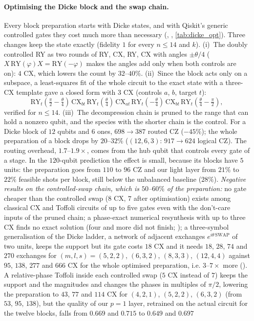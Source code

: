 \paragraph{Optimising the Dicke block and the swap chain.}  Every block preparation starts with Dicke states, and with Qiskit's generic controlled gates they cost much more than necessary (, , \cref{tab:dicke_opt}). Three changes keep the state exactly (fidelity $1$ for every $n\le14$ and $k$). (i)~The doubly controlled RY as two rounds of RY, CX, RY, CX with angles $\pm\theta/4$ ($X\,\mathrm{RY}(\varphi)X=\mathrm{RY}(-\varphi)$ makes the angles add only when both controls are on): $4$ CX, which lowers the count by $32$--$40\%$. (ii)~Since the block acts only on a subspace, a least-squares fit of the whole circuit to the exact state with a three-CX template gave a closed form with $3$ CX (controls $a$, $b$, target $t$): \begin{equation*}\mathrm{RY}_t(\tfrac{\pi}{2}-\tfrac{\theta}{4})\,\mathrm{CX}_{bt}\,\mathrm{RY}_t(\tfrac{\theta}{4})\,\mathrm{CX}_{at}\,\mathrm{RY}_t(-\tfrac{\theta}{4})\,\mathrm{CX}_{bt}\,\mathrm{RY}_t(\tfrac{\theta}{4}-\tfrac{\pi}{2}),\end{equation*}verified for $n\le14$. (iii)~The decompression chain is pruned to the range that can hold a nonzero qubit, and the species with the shorter chain is the control. For a Dicke block of $12$ qubits and $6$ ones, $698\to387$ routed CZ ($-45\%$); the whole preparation of a block drops by $20$--$32\%$ ($(12,6,3)$: $917\to624$ logical CZ). The routing overhead, $1.7$--$1.9\times$, comes from the hub qubit that controls every gate of a stage. In the $120$-qubit prediction the effect is small, because its blocks have $5$ units: the preparation goes from $110$ to $96$ CZ and our light layer from $21\%$ to $22\%$ feasible shots per block, still below the unbalanced baseline ($28\%$). \emph{Negative results on the controlled-swap chain, which is $50$--$60\%$ of the preparation:} no gate cheaper than the controlled swap ($8$ CX, $7$ after optimisation) exists among classical CX and Toffoli circuits of up to five gates even with the don't-care inputs of the pruned chain; a phase-exact numerical resynthesis with up to three CX finds no exact solution (four and more did not finish; ); a three-symbol generalisation of the Dicke ladder, a network of adjacent exchanges $e^{i\theta\,\mathrm{SWAP}}$ of two units, keeps the support but its gate costs $18$ CX and it needs $18$, $28$, $74$ and $270$ exchanges for $(m,l,s)=(5,2,2)$, $(6,3,2)$, $(8,3,3)$, $(12,4,4)$ against $95$, $138$, $277$ and $666$ CX for the whole optimised preparation, i.e. $3$--$7\times$ more (). A relative-phase Toffoli inside each controlled swap ($5$ CX instead of $7$) keeps the support and the magnitudes and changes the phases in multiples of $\pi/2$, lowering the preparation to $43$, $77$ and $114$ CX for $(4,2,1)$, $(5,2,2)$, $(6,3,2)$ (from $53$, $95$, $138$), but the quality of our $p=1$ layer, retrained on the actual circuit for the twelve blocks, falls from $0.669$ and $0.715$ to $0.649$ and $0.697$ 